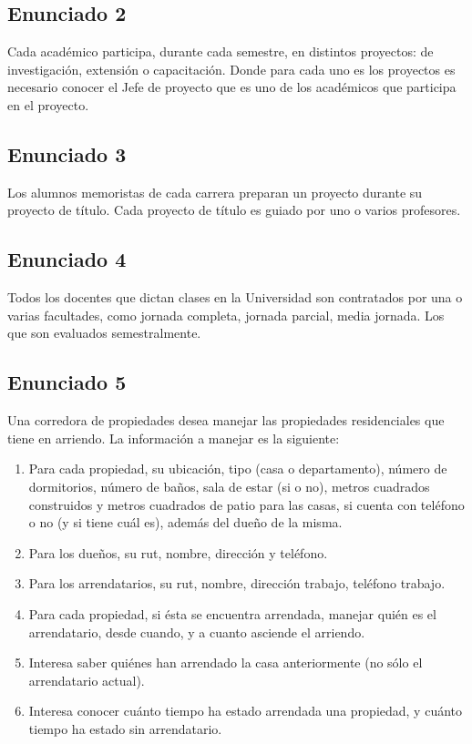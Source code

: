 \documentclass{templateNote}
\begin{document}

\newpage
\subsection{Enunciado 2}
\indent
Cada académico participa, durante cada semestre, en distintos proyectos: de investigación,
extensión o capacitación. Donde para cada uno es los proyectos es necesario conocer el Jefe de
proyecto que es uno de los académicos que participa en el proyecto.


\newpage
\subsection{Enunciado 3}
\indent
Los alumnos memoristas de cada carrera preparan un proyecto durante su proyecto de título.
Cada proyecto de título es guiado por uno o varios profesores.


\subsection{Enunciado 4}
\indent
Todos los docentes que dictan clases en la Universidad son contratados por una o varias
facultades, como jornada completa, jornada parcial, media jornada. Los que son evaluados
semestralmente.


\newpage
\subsection{Enunciado 5}
Una corredora de propiedades desea manejar las propiedades residenciales que tiene en arriendo.
La información a manejar es la siguiente:
\begin{enumerate}
    \item Para cada propiedad, su ubicación, tipo (casa o departamento), número de dormitorios, número
    de baños, sala de estar (si o no), metros cuadrados construidos y metros cuadrados de patio para
    las casas, si cuenta con teléfono o no (y si tiene cuál es), además del dueño de la misma.
    \item Para los dueños, su rut, nombre, dirección y teléfono.
    \item Para los arrendatarios, su rut, nombre, dirección trabajo, teléfono trabajo.
    \item Para cada propiedad, si ésta se encuentra arrendada, manejar quién es el arrendatario, desde
    cuando, y a cuanto asciende el arriendo.
    \item Interesa saber quiénes han arrendado la casa anteriormente (no sólo el arrendatario actual).
    \item Interesa conocer cuánto tiempo ha estado arrendada una propiedad, y cuánto tiempo ha estado
    sin arrendatario.
\end{enumerate}
\end{document}

